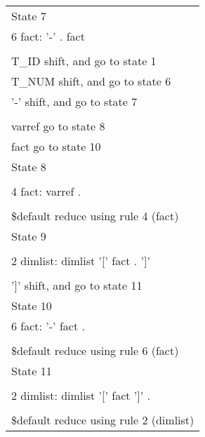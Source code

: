 \begin{minipage}{\linewidth}
\begin{footnotesize}
\begin{minipage}[c]{0.31\linewidth}
\end{minipage}%
\begin{minipage}[c]{0.31\linewidth}
\begin{tabular}{|l|}
\hline
State 7\\
    6 fact: '-' . fact\\
\\
    T\_ID   shift, and go to state 1\\
    T\_NUM  shift, and go to state 6\\
    '-'    shift, and go to state 7\\
\\
    varref  go to state 8\\
    fact    go to state 10\\
\hline
State 8\\
\\
4 fact: varref .\\
\\
\$default  reduce using rule 4 (fact)\\
\hline
State 9\\
\\
    2 dimlist: dimlist '[' fact . ']'\\
\\
    ']'  shift, and go to state 11\\
\hline
State 10\\
    6 fact: '-' fact .\\
\\
    \$default  reduce using rule 6 (fact)\\
\hline
State 11\\
\\
    2 dimlist: dimlist '[' fact ']' .\\
\\
\$default  reduce using rule 2 (dimlist)\\
\hline
\end{tabular}
\end{minipage}
\end{footnotesize}
\end{minipage}

